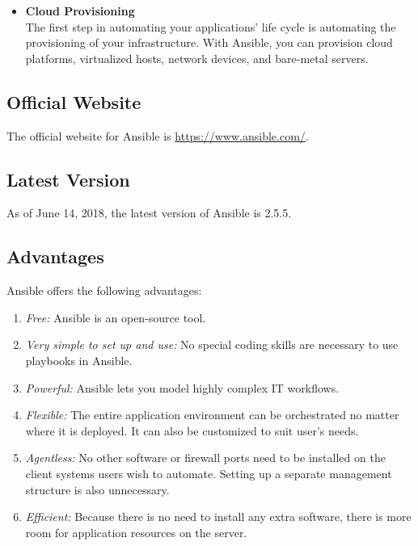 \documentclass[a4paper, 12pt]{article}
\begin{document}
\begin{itemize}
\item
\textbf{Cloud Provisioning}\\
The first step in automating your applications' life cycle is automating the provisioning of your infrastructure. With Ansible, you can provision cloud platforms, virtualized hosts, network devices, and bare-metal servers.
\end{itemize}

\subsection{Official Website}
The official website for Ansible is \href{https://www.ansible.com/}{https://www.ansible.com/}.
\subsection{Latest Version}
As of June 14, 2018, the latest version of Ansible is 2.5.5.
\subsection{Advantages}
Ansible offers the following advantages:
\begin{enumerate}
\item
\textit{Free:} Ansible is an open-source tool.
\item
\textit{Very simple to set up and use:} No special coding skills are necessary to use playbooks in Ansible.
\item
\textit{Powerful:} Ansible lets you model highly complex IT workflows.
\item
\textit{Flexible:} The entire application environment can be orchestrated no matter where it is deployed. It can also be customized to suit user's needs.
\item
\textit{Agentless:} No other software or firewall ports need to be installed on the client systems users wish to automate. Setting up a separate management structure is also unnecessary. 
\item
\textit{Efficient:} Because there is no need to install any extra software, there is more room for application resources on the server.
\end{enumerate}
\end{document}
